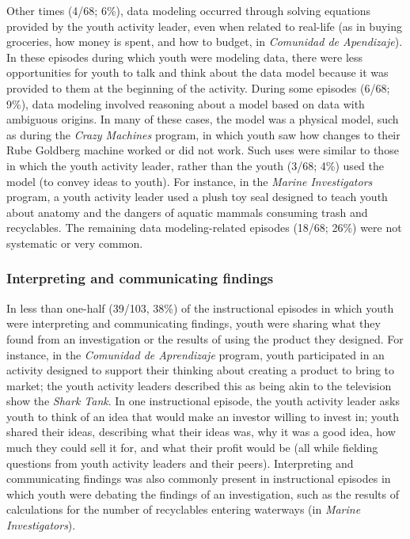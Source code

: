\documentclass[]{book}
\theoremstyle{definition}
\theoremstyle{definition}
\theoremstyle{definition}
\theoremstyle{remark}
\begin{document}
Other times (4/68; 6\%), data modeling occurred through solving
equations provided by the youth activity leader, even when related to
real-life (as in buying groceries, how money is spent, and how to
budget, in \emph{Comunidad de Apendizaje}). In these episodes during
which youth were modeling data, there were less opportunities for youth
to talk and think about the data model because it was provided to them
at the beginning of the activity. During some episodes (6/68; 9\%), data
modeling involved reasoning about a model based on data with ambiguous
origins. In many of these cases, the model was a physical model, such as
during the \emph{Crazy Machines} program, in which youth saw how changes
to their Rube Goldberg machine worked or did not work. Such uses were
similar to those in which the youth activity leader, rather than the
youth (3/68; 4\%) used the model (to convey ideas to youth). For
instance, in the \emph{Marine Investigators} program, a youth activity
leader used a plush toy seal designed to teach youth about anatomy and
the dangers of aquatic mammals consuming trash and recyclables. The
remaining data modeling-related episodes (18/68; 26\%) were not
systematic or very common.

\subsubsection{Interpreting and communicating
findings}\label{interpreting-and-communicating-findings}

In less than one-half (39/103, 38\%) of the instructional episodes in
which youth were interpreting and communicating findings, youth were
sharing what they found from an investigation or the results of using
the product they designed. For instance, in the \emph{Comunidad de
Aprendizaje} program, youth participated in an activity designed to
support their thinking about creating a product to bring to market; the
youth activity leaders described this as being akin to the television
show the \emph{Shark Tank}. In one instructional episode, the youth
activity leader asks youth to think of an idea that would make an
investor willing to invest in; youth shared their ideas, describing what
their ideas was, why it was a good idea, how much they could sell it
for, and what their profit would be (all while fielding questions from
youth activity leaders and their peers). Interpreting and communicating
findings was also commonly present in instructional episodes in which
youth were debating the findings of an investigation, such as the
results of calculations for the number of recyclables entering waterways
(in \emph{Marine Investigators}).
\end{document}
